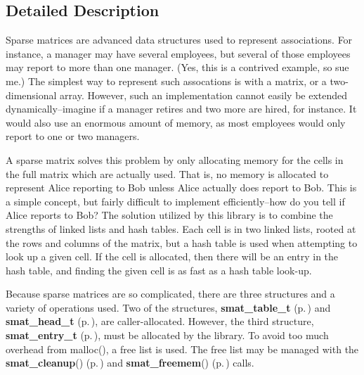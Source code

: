 

\subsection{Detailed Description}
Sparse matrices are advanced data structures used to represent associations. For instance, a manager may have several employees, but several of those employees may report to more than one manager. (Yes, this is a contrived example, so sue me.) The simplest way to represent such assocations is with a matrix, or a two-dimensional array. However, such an implementation cannot easily be extended dynamically--imagine if a manager retires and two more are hired, for instance. It would also use an enormous amount of memory, as most employees would only report to one or two managers.

A sparse matrix solves this problem by only allocating memory for the cells in the full matrix which are actually used. That is, no memory is allocated to represent Alice reporting to Bob unless Alice actually does report to Bob. This is a simple concept, but fairly difficult to implement efficiently--how do you tell if Alice reports to Bob? The solution utilized by this library is to combine the strengths of linked lists and hash tables. Each cell is in two linked lists, rooted at the rows and columns of the matrix, but a hash table is used when attempting to look up a given cell. If the cell is allocated, then there will be an entry in the hash table, and finding the given cell is as fast as a hash table look-up.

Because sparse matrices are so complicated, there are three structures and a variety of operations used. Two of the structures, {\bf smat\_\-table\_\-t} {\rm (p.\,\pageref{group__dbprim__smat_a0})} and {\bf smat\_\-head\_\-t} {\rm (p.\,\pageref{group__dbprim__smat_a1})}, are caller-allocated. However, the third structure, {\bf smat\_\-entry\_\-t} {\rm (p.\,\pageref{group__dbprim__smat_a2})}, must be allocated by the library. To avoid too much overhead from malloc(), a free list is used. The free list may be managed with the {\bf smat\_\-cleanup}() {\rm (p.\,\pageref{group__dbprim__smat_a7})} and {\bf smat\_\-freemem}() {\rm (p.\,\pageref{group__dbprim__smat_a8})} calls.

